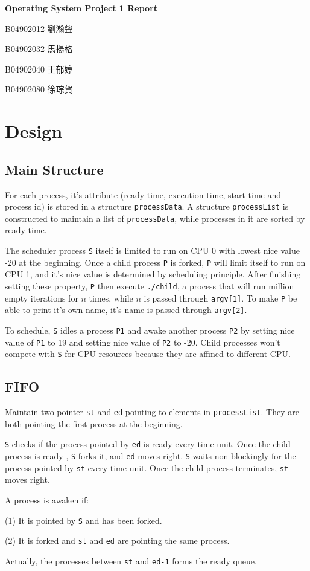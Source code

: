\documentclass{article}
\begin{document}
\fontsize{12pt}{20pt}\selectfont
\begin{center}
	\bfseries\huge{Operating System Project 1 Report}\\
\end{center}
{
    \hfill B04902012 劉瀚聲

    \hfill B04902032 馬揚格

    \hfill B04902040 王郁婷

    \hfill B04902080 徐琮賀\\
}
\section{Design}
    \subsection{Main Structure}

        For each process, it's attribute (ready time, execution time, start time and process id) is stored in a structure {\tt processData}.
        A structure {\tt processList} is constructed to maintain a list of {\tt processData}, while processes in it are sorted by ready time.

        The scheduler process {\tt S} itself is limited to run on CPU 0 with lowest nice value -20 at the beginning. Once a child process {\tt P} is forked, {\tt P} will limit itself to run on CPU 1, and it's nice value is determined by scheduling principle. After finishing setting these property, {\tt P} then execute {\tt ./child}, a process that will run million empty iterations for \(n\) times, while \(n\) is passed through {\tt argv[1]}. To make {\tt P} be able to print it's own name, it's name is passed through {\tt argv[2]}.

        To schedule, {\tt S} idles a process {\tt P1} and awake another process {\tt P2} by setting nice value of {\tt P1}  to 19 and setting nice value of {\tt P2} to -20. Child processes won't compete with {\tt S} for CPU resources because they are affined to different CPU.
    
    \subsection{FIFO}
        Maintain two pointer {\tt st} and {\tt ed} pointing to elements in {\tt processList}. They are both pointing the first process at the beginning.
        
        {\tt S} checks if the process pointed by {\tt ed} is ready every time unit. Once the child process is ready , {\tt S} forks it, and {\tt ed} moves right. {\tt S} waits non-blockingly for the process pointed by {\tt st} every time unit. Once the child process terminates, {\tt st} moves right.

        A process is awaken if: 

        (1) It is pointed by {\tt S} and has been forked.

        (2) It is forked and {\tt st} and {\tt ed} are pointing the same process.

        Actually, the processes between {\tt st} and {\tt ed-1} forms the ready queue.
\end{document}
